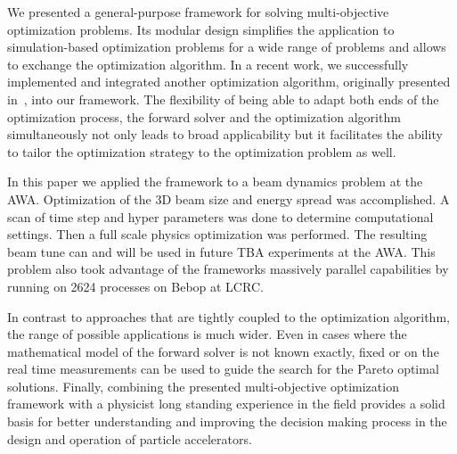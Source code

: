 \documentclass[%
reprint,
amsmath,amssymb,
aps,
prstab,
]{revtex4-1}
\begin{document}
We presented a general-purpose framework for solving multi-objective
  optimization problems.
Its modular design simplifies the application to simulation-based optimization
  problems for a wide range of problems and allows to exchange the
  optimization algorithm.
In a recent work, we successfully implemented and integrated another
  optimization algorithm, originally presented in~\cite{pesc:11}, into our
  framework.
The flexibility of being able to adapt both ends of the optimization
  process, the forward solver and the optimization algorithm simultaneously
  not only leads to broad applicability but it facilitates the ability to
  tailor the optimization strategy to the optimization problem as well.

%
%  
%
In this paper we applied the framework to a beam dynamics problem at the AWA.
Optimization of the 3D beam size and energy spread was accomplished.
A scan of time step and hyper parameters was done to determine computational settings.
Then a full scale physics optimization was performed.
The resulting beam tune can and will be used in future TBA experiments at the AWA.
This problem also took advantage of the frameworks massively parallel capabilities by
running on 2624 processes on Bebop at LCRC.

In contrast to approaches that are tightly coupled to the optimization
  algorithm, the range of possible applications is much wider.
Even in cases where the mathematical model of the forward solver is not known
  exactly, fixed or on the real time measurements can be used to guide the
  search for the Pareto optimal solutions.
Finally, combining the presented multi-objective optimization framework with
  a physicist long standing experience in the field provides a solid basis
  for better understanding and improving the decision making process in the
  design and operation of particle accelerators.
\end{document}
